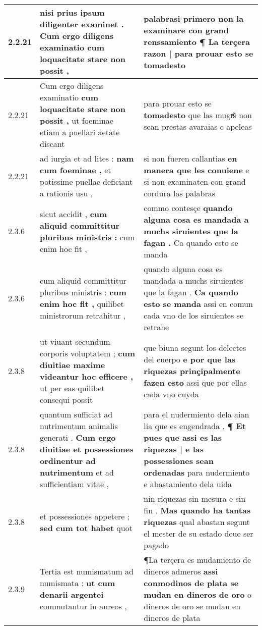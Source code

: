 \begin{tabular}{|p{1cm}|p{6.5cm}|p{6.5cm}|}
2.2.21 & nisi prius ipsum diligenter examinet . \textbf{ Cum ergo diligens examinatio } cum loquacitate stare non possit , & palabrasi primero non la examinare con grand renssamiento ¶ \textbf{ La terçera razon | para prouar esto se } tomadesto \\\hline
2.2.21 & Cum ergo diligens examinatio \textbf{ cum loquacitate stare non possit , } ut foeminae etiam a puellari aetate discant & para prouar esto se \textbf{ tomadesto } que las mugrͣ̃s non sean prestas avaraias e apeleas \\\hline
2.2.21 & ad iurgia et ad lites : \textbf{ nam cum foeminae , } et potissime puellae deficiant a rationis usu , & si non fueren callantias \textbf{ en manera que les conuiene } e si non examinaten con grand cordura las palabras \\\hline
2.3.6 & sicut accidit , \textbf{ cum aliquid committitur pluribus ministris : } cum enim hoc fit , & commo contesçe \textbf{ quando alguna cosa es mandada a muchs siruientes que la fagan . } Ca quando esto se manda \\\hline
2.3.6 & cum aliquid committitur pluribus ministris : \textbf{ cum enim hoc fit , } quilibet ministrorum retrahitur , & quando alguna cosa es mandada a muchs siruientes que la fagan . \textbf{ Ca quando esto se manda } assi en comun cada vno de los siruientes se retrahe \\\hline
2.3.8 & ut viuant secundum corporis voluptatem ; \textbf{ cum diuitiae maxime videantur hoc efficere , } ut per eas quilibet consequi possit & que biuna segunt los delectes del cuerpo \textbf{ e por que las riquezas prinçipalmente fazen esto } assi que por ellas cada vno cuyda \\\hline
2.3.8 & quantum sufficiat ad nutrimentum animalis generati . \textbf{ Cum ergo diuitiae et possessiones ordinentur ad nutrimentum } et ad sufficientiam vitae , & para el nudermiento dela aian lia que es engendrada . \textbf{ ¶ Et pues que assi es las riquezas | e las possessiones sean ordenadas } para nudermiento e abastamiento dela uida \\\hline
2.3.8 & et possessiones appetere ; \textbf{ sed cum tot habet } quot & nin riquezas sin mesura e sin fin . \textbf{ Mas quando ha tantas riquezas } qual abastan segunt el mester de su estado deue ser pagado \\\hline
2.3.9 & Tertia est numismatum ad numismata : \textbf{ ut cum denarii argentei } commutantur in aureos , & ¶La terçera es mudamiento de dineros admeros \textbf{ assi conmodinos de plata se mudan en dineros de oro } o dineros de oro se mudan en dineros de plata \\\hline

\end{tabular}

